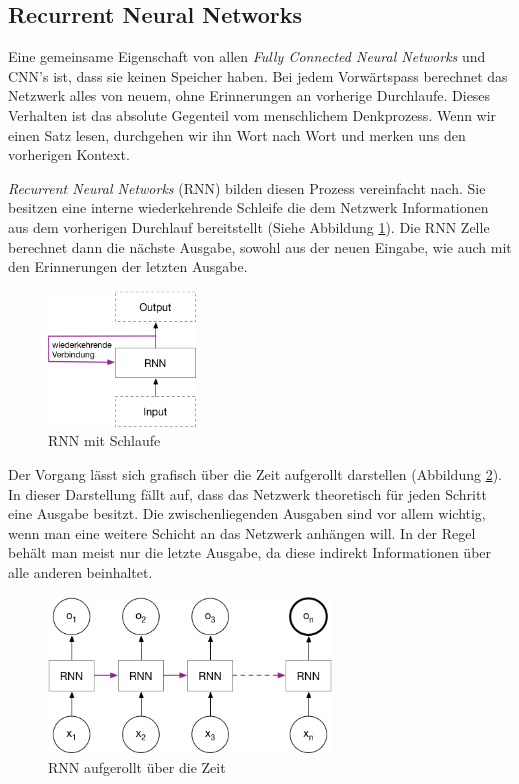 \subsection{Recurrent Neural Networks}
Eine gemeinsame Eigenschaft von allen \textit{Fully Connected Neural Networks} und CNN's ist, dass sie keinen Speicher haben. Bei jedem Vorwärtspass berechnet das Netzwerk alles von neuem, ohne Erinnerungen an vorherige Durchlaufe. Dieses Verhalten ist das absolute Gegenteil vom menschlichem Denkprozess. Wenn wir einen Satz lesen, durchgehen wir ihn Wort nach Wort und merken uns den vorherigen Kontext.

\textit{Recurrent Neural Networks} (RNN) bilden diesen Prozess vereinfacht nach. Sie besitzen eine interne wiederkehrende Schleife die dem Netzwerk Informationen aus dem vorherigen Durchlauf bereitstellt (Siehe Abbildung \ref{img:rnn_loop}). Die RNN Zelle berechnet dann die nächste Ausgabe, sowohl aus der neuen Eingabe, wie auch mit den Erinnerungen der letzten Ausgabe. \parencite{chollet}\\
\begin{figure}[hbt]
	\centering
		\includegraphics[width=0.35\textwidth]{assets/rnn_loop.png}
	\caption{RNN mit Schlaufe}
	\label{img:rnn_loop}
\end{figure}

Der Vorgang lässt sich grafisch über die Zeit aufgerollt darstellen (Abbildung \ref{img:rnn_unrolled}). In dieser Darstellung fällt auf, dass das Netzwerk theoretisch für jeden Schritt eine Ausgabe besitzt. Die zwischenliegenden Ausgaben sind vor allem wichtig, wenn man eine weitere Schicht an das Netzwerk anhängen will. In der Regel behält man meist nur die letzte Ausgabe, da diese indirekt Informationen über alle anderen beinhaltet.\\
\begin{figure}[hbt]
	\centering
		\includegraphics[width=0.67\textwidth]{assets/rnn_unrolled.png}
	\caption{RNN aufgerollt über die Zeit}
	\label{img:rnn_unrolled}
\end{figure}

